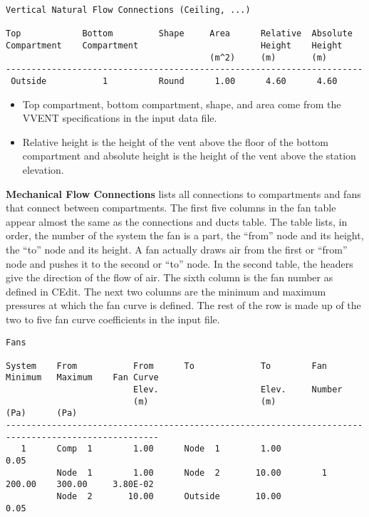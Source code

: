 \begin{lstlisting}[basicstyle=\tiny]
Vertical Natural Flow Connections (Ceiling, ...)

Top            Bottom         Shape     Area      Relative  Absolute
Compartment    Compartment                        Height    Height
                                        (m^2)     (m)       (m)       
----------------------------------------------------------------------
 Outside           1          Round      1.00      4.60      4.60
 \end{lstlisting}
 
\begin{itemize}
\item Top compartment, bottom compartment, shape, and area come from the VVENT specifications in the input data file.
\item Relative height is the height of the vent above the floor of the bottom compartment and absolute height is the height of the vent above the station elevation.
\end{itemize}

\textbf{Mechanical Flow Connections} lists all connections to compartments and fans that connect between compartments. The first five columns in the fan table appear almost the same as the connections and ducts table.  The table lists, in order, the number of the system the fan is a part, the ``from'' node and its height, the ``to'' node and its height.  A fan actually draws air from the first or ``from'' node and pushes it to the second or ``to'' node.  In the second table, the headers give the direction of the flow of air.  The sixth column is the fan number as defined in CEdit.  The next two columns are the minimum and maximum pressures at which the fan curve is defined.  The rest of the row is made up of the two to five fan curve coefficients in the input file.

\begin{lstlisting}[basicstyle=\tiny]
Fans

System    From           From      To             To        Fan       Minimum   Maximum    Fan Curve
                         Elev.                    Elev.     Number
                         (m)                      (m)                 (Pa)      (Pa)
----------------------------------------------------------------------------------------------------
   1      Comp  1        1.00      Node  1        1.00                0.05
          Node  1        1.00      Node  2       10.00        1       200.00    300.00     3.80E-02
          Node  2       10.00      Outside       10.00                0.05
\end{lstlisting}

